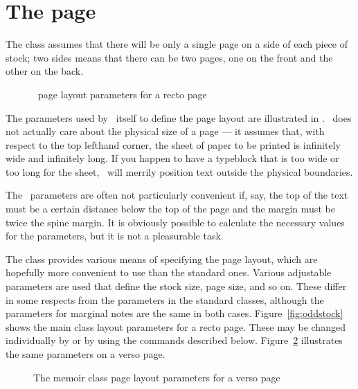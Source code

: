 \section{The page}
\label{sec:page}
 
    The class assumes that there will be only a single page on a side of
each piece of stock; two sides means that there can be two
pages, one on the front and the other on the back. 

\begin{figure}
\centering
\drawpage
\caption{\ltx\ page layout parameters for a recto page} \label{fig:anoddpage}
\end{figure}

    The parameters 
used by \ltx\ itself to define the page layout are 
illustrated in . \ltx\ does not actually care about the
physical size of a page --- it assumes that, with respect to the top lefthand
corner, the sheet of paper to be printed is infinitely wide 
and infinitely long. If you happen to have a typeblock 
that is too wide or too long for the sheet, \ltx\ will merrily position 
text outside the physical boundaries.

    The \ltx\ parameters are often not particularly convenient if, say, 
the top of the text must be a certain distance below the top of the page 
and the \foredge{} margin must be twice 
the spine margin. It is obviously possible
to calculate the necessary values for the parameters, but it is
not a pleasurable task.

    The class provides various means of specifying the page layout, which are
hopefully more convenient to use than the standard ones. Various
adjustable parameters are used that 
define the stock size, page size, and so 
on. These differ in some respects from the parameters in the standard classes,
although the parameters for marginal notes are the same in both cases.
Figure~\ref{fig:oddstock} shows the main class layout parameters for a
recto page.
These may be changed individually by \cmd{\setlength} or by using the 
commands described below. Figure~\ref{fig:evenstock} illustrates the
same parameters on a verso page.


\begin{figure}
\centering
\oddpagelayoutfalse
\drawstock
\caption{The \textsf{memoir} class page layout parameters for a verso page} \label{fig:evenstock}
\end{figure}

